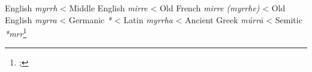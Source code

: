 \begin{etymology}\label{ety:myrrh}
English \textit{myrrh}
< Middle English \textit{mirre}
< Old French \textit{mirre (myrrhe)}
< Old English \textit{myrra}
< Germanic \textit{*}
< Latin \textit{myrrha}
< Ancient Greek \textit{múrrā}
< Semitic \textit{*mrr}\footnote{; }
\end{etymology}